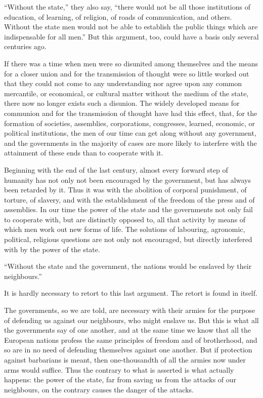 \documentclass{book}
\begin{document}
“Without the state,” they also say, “there would not be all those institutions of education, of learning, of religion, of roads of communication, and others. Without the state men would not be able to establish the public things which are indispensable for all men.” But this argument, too, could have a basis only several centuries ago.

If there was a time when men were so disunited among themselves and the means for a closer union and for the transmission of thought were so little worked out that they could not come to any understanding nor agree upon any common mercantile, or economical, or cultural matter without the medium of the state, there now no longer exists such a disunion. The widely developed means for communion and for the transmission of thought have had this effect, that, for the formation of societies, assemblies, corporations, congresses, learned, economic, or political institutions, the men of our time can get along without any government, and the governments in the majority of cases are more likely to interfere with the attainment of these ends than to cooperate with it.

Beginning with the end of the last century, almost every forward step of humanity has not only not been encouraged by the government, but has always been retarded by it. Thus it was with the abolition of corporal punishment, of torture, of slavery, and with the establishment of the freedom of the press and of assemblies. In our time the power of the state and the governments not only fail to cooperate with, but are distinctly opposed to, all that activity by means of which men work out new forms of life. The solutions of labouring, agronomic, political, religious questions are not only not encouraged, but directly interfered with by the power of the state.

“Without the state and the government, the nations would be enslaved by their neighbours.”

It is hardly necessary to retort to this last argument. The retort is found in itself.

The governments, so we are told, are necessary with their armies for the purpose of defending us against our neighbours, who might enslave us. But this is what all the governments say of one another, and at the same time we know that all the European nations profess the same principles of freedom and of brotherhood, and so are in no need of defending themselves against one another. But if protection against barbarians is meant, then one-thousandth of all the armies now under arms would suffice. Thus the contrary to what is asserted is what actually happens: the power of the state, far from saving us from the attacks of our neighbours, on the contrary causes the danger of the attacks.
\end{document}
